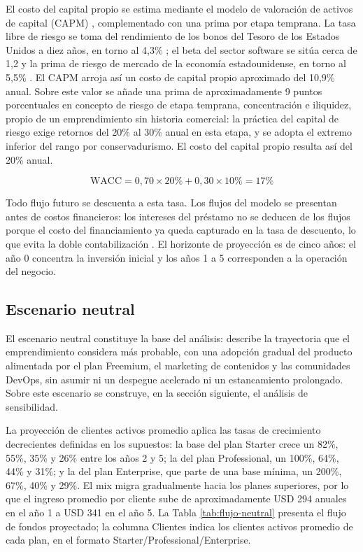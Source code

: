 El costo del capital propio se estima mediante el modelo de valoración de activos de capital (CAPM) \parencite{Brealey2023}, complementado con una prima por etapa temprana. La tasa libre de riesgo se toma del rendimiento de los bonos del Tesoro de los Estados Unidos a diez años, en torno al 4,3\% \parencite{USTreasury2026}; el beta del sector software se sitúa cerca de 1,2 y la prima de riesgo de mercado de la economía estadounidense, en torno al 5,5\% \parencite{Damodaran2026}. El CAPM arroja así un costo de capital propio aproximado del 10,9\% anual. Sobre este valor se añade una prima de aproximadamente 9 puntos porcentuales en concepto de riesgo de etapa temprana, concentración e iliquidez, propio de un emprendimiento sin historia comercial: la práctica del capital de riesgo exige retornos del 20\% al 30\% anual en esta etapa, y se adopta el extremo inferior del rango por conservadurismo. El costo del capital propio resulta así del 20\% anual.

\begin{equation*}
\mathrm{WACC} = 0{,}70 \times 20\% + 0{,}30 \times 10\% = 17\%
\end{equation*}

Todo flujo futuro se descuenta a esta tasa. Los flujos del modelo se presentan antes de costos financieros: los intereses del préstamo no se deducen de los flujos porque el costo del financiamiento ya queda capturado en la tasa de descuento, lo que evita la doble contabilización \parencite{Brealey2023}. El horizonte de proyección es de cinco años: el año 0 concentra la inversión inicial y los años 1 a 5 corresponden a la operación del negocio.

\subsection{Escenario neutral}

El escenario neutral constituye la base del análisis: describe la trayectoria que el emprendimiento considera más probable, con una adopción gradual del producto alimentada por el plan Freemium, el marketing de contenidos y las comunidades DevOps, sin asumir ni un despegue acelerado ni un estancamiento prolongado. Sobre este escenario se construye, en la sección siguiente, el análisis de sensibilidad.

La proyección de clientes activos promedio aplica las tasas de crecimiento decrecientes definidas en los supuestos: la base del plan Starter crece un 82\%, 55\%, 35\% y 26\% entre los años 2 y 5; la del plan Professional, un 100\%, 64\%, 44\% y 31\%; y la del plan Enterprise, que parte de una base mínima, un 200\%, 67\%, 40\% y 29\%. El mix migra gradualmente hacia los planes superiores, por lo que el ingreso promedio por cliente sube de aproximadamente USD 294 anuales en el año 1 a USD 341 en el año 5. La Tabla \ref{tab:flujo-neutral} presenta el flujo de fondos proyectado; la columna Clientes indica los clientes activos promedio de cada plan, en el formato Starter/Professional/Enterprise.

